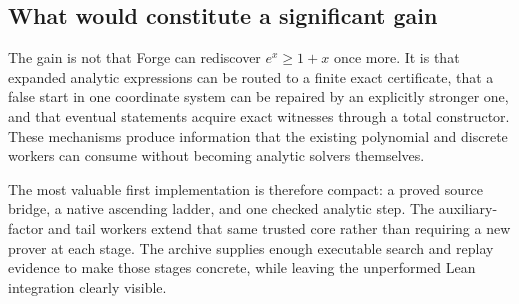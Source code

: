 \subsection{What would constitute a significant gain}

The gain is not that Forge can rediscover $e^x\ge1+x$ once more. It is that
expanded analytic expressions can be routed to a finite exact certificate,
that a false start in one coordinate system can be repaired by an explicitly
stronger one, and that eventual statements acquire exact witnesses through a
total constructor. These mechanisms produce information that the existing
polynomial and discrete workers can consume without becoming analytic solvers
themselves.

The most valuable first implementation is therefore compact: a proved source
bridge, a native ascending ladder, and one checked analytic step. The
auxiliary-factor and tail workers extend that same trusted core rather than
requiring a new prover at each stage. The archive supplies enough executable
search and replay evidence to make those stages concrete, while leaving the
unperformed Lean integration clearly visible.
